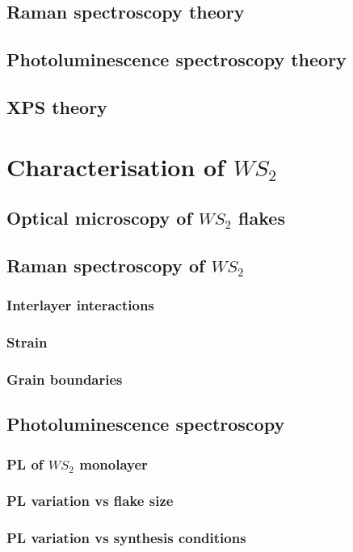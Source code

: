 \documentclass[12pt]{article}
\begin{document}
	\subsection{Raman spectroscopy theory}
	\subsection{Photoluminescence spectroscopy theory}
	\subsection{XPS theory}
\section{Characterisation of $WS_2$}
	\subsection{Optical microscopy of $WS_2$ flakes}
	\subsection{Raman spectroscopy of $WS_2$}
		\subsubsection{Interlayer interactions}
		\subsubsection{Strain}
		\subsubsection{Grain boundaries}
	\subsection{Photoluminescence spectroscopy}
		\subsubsection{PL of $WS_2$ monolayer}
		\subsubsection{PL variation vs flake size}
		\subsubsection{PL variation vs synthesis conditions}
\end{document}

